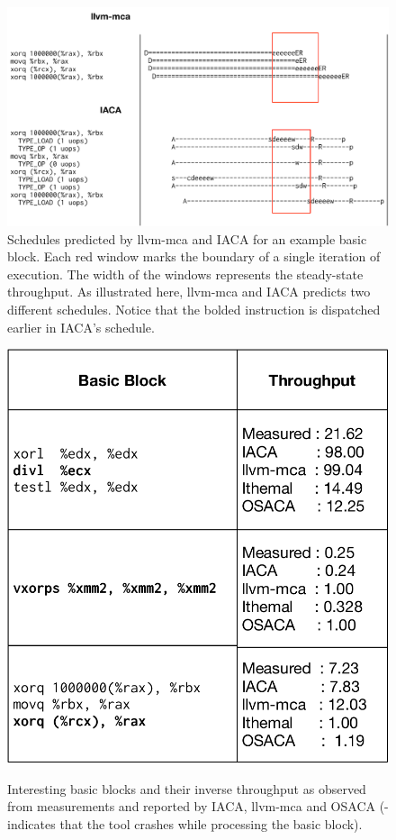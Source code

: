 \begin{figure}[htbp!]
    \includegraphics[width=0.95\columnwidth]{figures/scheduling.pdf}
    \caption{Schedules predicted by llvm-mca and IACA for an example basic block.
    Each red window marks the boundary of a single iteration of execution.
    The width of the windows represents the steady-state throughput.
    As illustrated here, llvm-mca and IACA predicts two different schedules.
    Notice that the bolded instruction is dispatched earlier in IACA's schedule.
    }
    \label{tab:case-study}
\end{figure}

\begin{figure}[htbp!]
    \begin{center}
    \includegraphics[width=0.7\columnwidth]{figures/interesting-examples.pdf}
    \caption{Interesting basic blocks and their inverse throughput as observed from measurements and reported by IACA, llvm-mca and OSACA (- indicates that the tool crashes while processing the basic block).}
    \label{tab:case-study}
    \label{fig:schedule}
    \end{center}
\end{figure}

